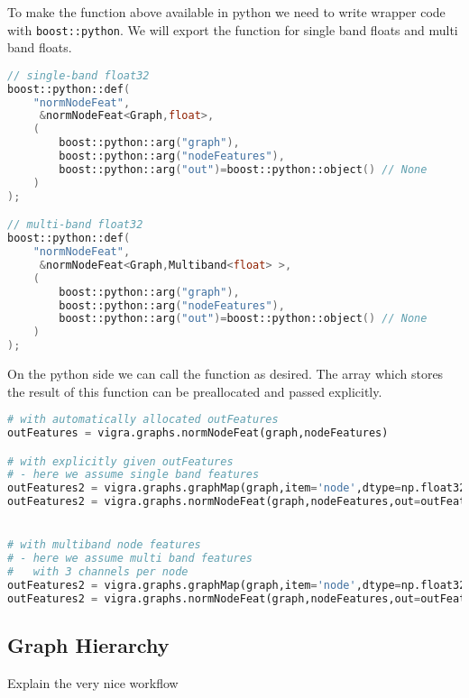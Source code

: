 \begin{minipage}{\textwidth}
To make the function above available in python
we need to write wrapper code with \lstinline{boost::python}.
We will export the function for single band floats and multi band floats.

\begin{lstlisting}[language=c++]
// single-band float32
boost::python::def(
    "normNodeFeat",
     &normNodeFeat<Graph,float>,
    (
        boost::python::arg("graph"),
        boost::python::arg("nodeFeatures"),
        boost::python::arg("out")=boost::python::object() // None
    )
);

// multi-band float32
boost::python::def(
    "normNodeFeat",
     &normNodeFeat<Graph,Multiband<float> >,
    (
        boost::python::arg("graph"),
        boost::python::arg("nodeFeatures"),
        boost::python::arg("out")=boost::python::object() // None
    )
);
\end{lstlisting}

\end{minipage}


On the python side we can call the function as desired.
The array which stores the result of this
function can be preallocated and passed explicitly.

\begin{lstlisting}[language=Python]
# with automatically allocated outFeatures
outFeatures = vigra.graphs.normNodeFeat(graph,nodeFeatures)

# with explicitly given outFeatures
# - here we assume single band features
outFeatures2 = vigra.graphs.graphMap(graph,item='node',dtype=np.float32)
outFeatures2 = vigra.graphs.normNodeFeat(graph,nodeFeatures,out=outFeatures2)


# with multiband node features 
# - here we assume multi band features
#   with 3 channels per node
outFeatures2 = vigra.graphs.graphMap(graph,item='node',dtype=np.float32,channels=3)
outFeatures2 = vigra.graphs.normNodeFeat(graph,nodeFeatures,out=outFeatures2)
\end{lstlisting}



\subsection{Graph Hierarchy}
    
Explain the very nice workflow 